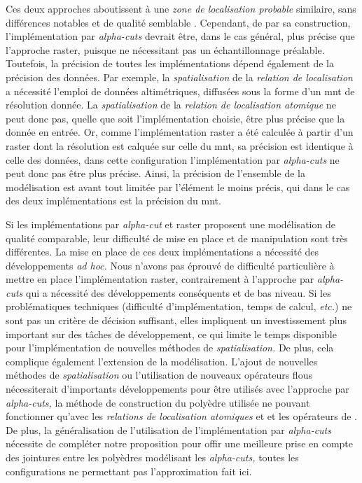 Ces deux approches aboutissent à une \emph{zone de localisation
  probable} similaire, sans différences notables et de qualité
semblable \autocite{Bunel2019a}. Cependant, de par sa construction,
l'implémentation par \emph{alpha-cuts} devrait être, dans le cas
général, plus précise que l'approche raster, puisque ne nécessitant
pas un échantillonnage préalable. Toutefois, la précision de toutes
les implémentations dépend également de la précision des données. Par
exemple, la \emph{spatialisation} de la \emph{relation de
  localisation}  a nécessité l'emploi de
données altimétriques, diffusées sous la forme d'un \ac{mnt} de
résolution donnée. La \emph{spatialisation} de la \emph{relation de
  localisation atomique}
 ne peut
donc pas, quelle que soit l'implémentation choisie, être plus précise
que la donnée en entrée. Or, comme l'implémentation raster a été
calculée à partir d'un raster dont la résolution est calquée sur celle
du \ac{mnt}, sa précision est identique à celle des données, dans
cette configuration l'implémentation par \emph{alpha-cuts} ne peut
donc pas être plus précise. Ainsi, la précision de l'ensemble de la
modélisation est avant tout limitée par l'élément le moins précis, qui
dans le cas des deux implémentations est la précision du \ac{mnt}.


Si les implémentations par \emph{alpha-cut} et raster proposent une
modélisation de qualité comparable, leur difficulté de mise en place
et de manipulation sont très différentes. La mise en place de ces deux
implémentations a nécessité des développements \emph{ad hoc.} Nous
n'avons pas éprouvé de difficulté particulière à mettre en place
l'implémentation raster, contrairement à l'approche par
\emph{alpha-cuts} qui a nécessité des développements conséquents et de
bas niveau. Si les problématiques techniques (\eg difficulté
d'implémentation, temps de calcul, \emph{etc.}) ne sont pas un critère
de décision suffisant, elles impliquent un investissement plus
important sur des tâches de développement, ce qui limite le temps
disponible pour l'implémentation de nouvelles méthodes de
\emph{spatialisation.} De plus, cela complique également l'extension
de la modélisation. L'ajout de nouvelles méthodes de
\emph{spatialisation} ou l'utilisation de nouveaux opérateurs flous
nécessiterait d'importants développements pour être utilisés avec
l'approche par \emph{alpha-cuts,} la méthode de construction du
polyèdre utilisée ne pouvant fonctionner qu'avec les \emph{relations
  de localisation atomiques}
 et
 et les opérateurs de \textcite{Zadeh1965}. De
plus, la généralisation de l'utilisation de l'implémentation par
\emph{alpha-cuts} nécessite de compléter notre proposition pour offir
une meilleure prise en compte des jointures entre les polyèdres
modélisant les \emph{alpha-cuts,} toutes les configurations ne
permettant pas l'approximation fait ici.


